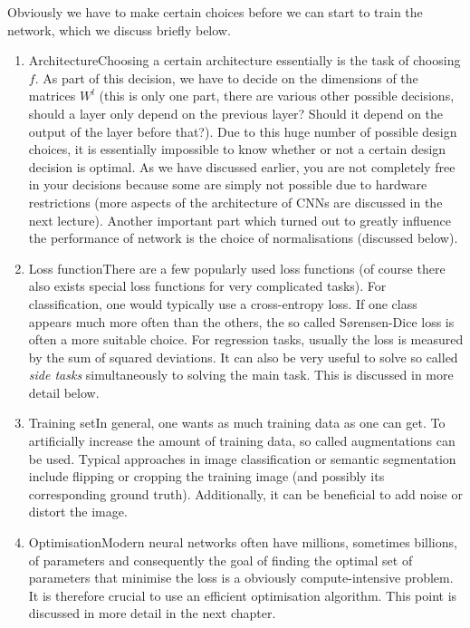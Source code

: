 Obviously we have to make certain choices before we can start to train the
network, which we discuss briefly below.
\begin{enumerate}
\item Architecture\qquad Choosing a certain architecture essentially is the task
  of choosing $f$. As part of this decision, we have to decide on the dimensions
  of the matrices $W^l$ (this is only one part, there are various other possible
  decisions, \eg should a layer only depend on the previous layer? Should it
  depend on the output of the layer before that?). Due to this huge number of
  possible design choices, it is essentially impossible to know whether or not a
  certain design decision is optimal. As we have discussed earlier, you are not
  completely free in your decisions because some are simply not possible due to
  hardware restrictions (more aspects of the architecture of CNNs are discussed
  in the next lecture). Another important part which turned out to greatly
  influence the performance of network is the choice of normalisations
  (discussed below).
\item Loss function\qquad There are a few popularly used loss functions (of
  course there also exists special loss functions for very complicated tasks).
  For classification, one would typically use a cross-entropy loss. If one class
  appears much more often than the others, the so called S{\o}rensen-Dice loss
  is often a more suitable choice. For regression tasks, usually the loss is
  measured by the sum of squared deviations. It can also be very useful to solve
  so called \emph{side tasks} simultaneously to solving the main task. This is
  discussed in more detail below.
\item Training set\qquad In general, one wants as much training data as one can
  get. To artificially increase the amount of training data, so called
  augmentations can be used. Typical approaches in image classification or
  semantic segmentation include flipping or cropping the training image (and
  possibly its corresponding ground truth). Additionally, it can be beneficial
  to add noise or distort the image.
\item Optimisation\qquad Modern neural networks often have millions, sometimes
  billions, of parameters and consequently the goal of finding the optimal set
  of parameters that minimise the loss is a obviously compute-intensive problem.
  It is therefore crucial to use an efficient optimisation algorithm. This point
  is discussed in more detail in the next chapter.
\end{enumerate}

